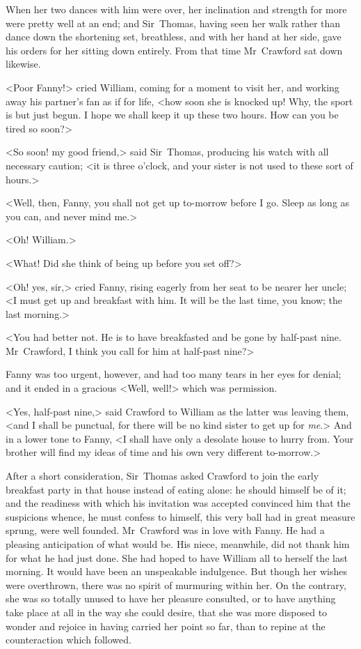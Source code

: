 When her two dances with him were over, her inclination and strength for more were pretty well at an end; and Sir~Thomas, having seen her walk rather than dance down the shortening set, breathless, and with her hand at her side, gave his orders for her sitting down entirely. From that time Mr~Crawford sat down likewise.

<Poor Fanny!> cried William, coming for a moment to visit her, and working away his partner's fan as if for life, <how soon she is knocked up! Why, the sport is but just begun. I hope we shall keep it up these two hours. How can you be tired so soon?>

<So soon! my good friend,> said Sir~Thomas, producing his watch with all necessary caution; <it is three o'clock, and your sister is not used to these sort of hours.>

<Well, then, Fanny, you shall not get up to-morrow before I go. Sleep as long as you can, and never mind me.>

<Oh! William.>

<What! Did she think of being up before you set off?>

<Oh! yes, sir,> cried Fanny, rising eagerly from her seat to be nearer her uncle; <I must get up and breakfast with him. It will be the last time, you know; the last morning.>

<You had better not. He is to have breakfasted and be gone by half-past nine. Mr~Crawford, I think you call for him at half-past nine?>

Fanny was too urgent, however, and had too many tears in her eyes for denial; and it ended in a gracious <Well, well!> which was permission.

<Yes, half-past nine,> said Crawford to William as the latter was leaving them, <and I shall be punctual, for there will be no kind sister to get up for \textit{me}.> And in a lower tone to Fanny, <I shall have only a desolate house to hurry from. Your brother will find my ideas of time and his own very different to-morrow.>

After a short consideration, Sir~Thomas asked Crawford to join the early breakfast party in that house instead of eating alone: he should himself be of it; and the readiness with which his invitation was accepted convinced him that the suspicions whence, he must confess to himself, this very ball had in great measure sprung, were well founded. Mr~Crawford was in love with Fanny. He had a pleasing anticipation of what would be. His niece, meanwhile, did not thank him for what he had just done. She had hoped to have William all to herself the last morning. It would have been an unspeakable indulgence. But though her wishes were overthrown, there was no spirit of murmuring within her. On the contrary, she was so totally unused to have her pleasure consulted, or to have anything take place at all in the way she could desire, that she was more disposed to wonder and rejoice in having carried her point so far, than to repine at the counteraction which followed.

